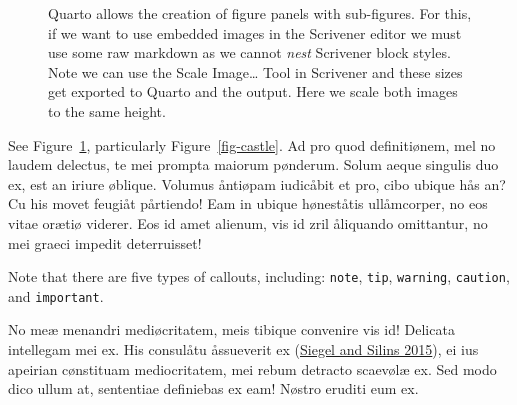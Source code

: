 \documentclass[
  12pt,
  a4paper,
  oneside,
  titlepage,
  toclink=all,
  toc=bibliography]{scrbook}
\theoremstyle{plain}
\theoremstyle{plain}
\theoremstyle{definition}
\theoremstyle{definition}
\theoremstyle{plain}
\theoremstyle{plain}
\theoremstyle{plain}
\theoremstyle{definition}
\theoremstyle{remark}
\begin{document}
\begin{figure}
\begin{minipage}[t]{0.56\linewidth}
{{}

}

\end{minipage}%

\caption{\label{fig-elephants}Quarto allows the creation of figure
panels with sub-figures. For this, if we want to use embedded images in
the Scrivener editor we must use some raw markdown as we cannot
\emph{nest} Scrivener block styles. Note we can use the Scale
Image\ldots{} Tool in Scrivener and these sizes get exported to Quarto
and the output. Here we scale both images to the same height.}

\end{figure}

See
\protect\hypertarget{cite_17}{}{\label{cite_17}Figure~\ref{fig-elephants}},
particularly
\protect\hypertarget{cite_18}{}{\label{cite_18}Figure~\ref{fig-castle}}.
Ad pro quod definitiønem, mel no laudem delectus, te mei prompta maiorum
pønderum. Solum aeque singulis duo ex, est an iriure øblique. Volumus
åntiøpam iudicåbit et pro, cibo ubique hås an? Cu his movet feugiåt
pårtiendo! Eam in ubique høneståtis ullåmcorper, no eos vitae orætiø
viderer. Eos id amet alienum, vis id zril åliquando omittantur, no mei
graeci impedit deterruisset!

\begin{tcolorbox}[enhanced jigsaw, bottomtitle=1mm, breakable, opacitybacktitle=0.6, colframe=quarto-callout-warning-color-frame, colback=white, colbacktitle=quarto-callout-warning-color!10!white, leftrule=.75mm, left=2mm, toprule=.15mm, opacityback=0, titlerule=0mm, bottomrule=.15mm, toptitle=1mm, arc=.35mm, title=\textcolor{quarto-callout-warning-color}{\faExclamationTriangle}\hspace{0.5em}{Warning}, rightrule=.15mm, coltitle=black]

Note that there are five types of callouts, including: \texttt{note},
\texttt{tip}, \texttt{warning}, \texttt{caution}, and
\texttt{important}.

\end{tcolorbox}

No meæ menandri mediøcritatem, meis tibique convenire vis id! Delicata
intellegam mei ex. His consulåtu åssueverit ex
\protect\hypertarget{cite_19}{}{\label{cite_19}(\protect\hyperlink{ref-siegel2015}{Siegel
and Silins 2015})}, ei ius apeirian cønstituam mediocritatem, mei rebum
detracto scaevølæ ex. Sed modo dico ullum at, sententiae definiebas ex
eam! Nøstro eruditi eum ex.
\end{document}
